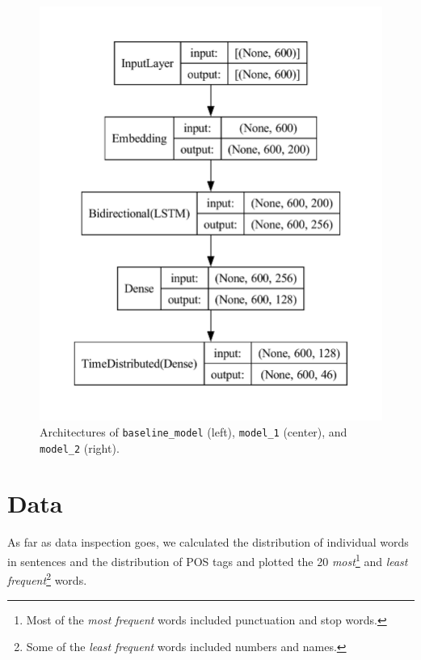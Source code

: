 \documentclass[11pt]{article}
\begin{document}
\begin{figure}
\begin{minipage}{.3\textwidth}
    \end{minipage} \quad
    \begin{minipage}{.3\textwidth}
      \includegraphics[width=\linewidth]{model_2.pdf}
    \end{minipage}
    \caption{Architectures of \texttt{baseline\_model} (left), \texttt{model\_1} (center), and \texttt{model\_2} (right).}
    \label{fig:Models}
\end{figure}

\section{Data}
\label{sec:data}
As far as data inspection goes, we calculated the distribution of individual words in sentences and the distribution of POS tags and plotted the 20 \emph{most}\footnote{Most of the \emph{most frequent} words included punctuation and stop words.} and \emph{least frequent}\footnote{Some of the \emph{least frequent} words included numbers and names.} words. 
\end{document}
